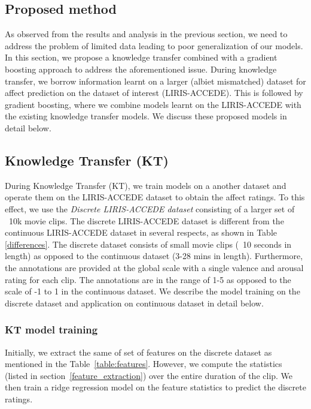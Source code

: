 \documentclass{article}
\begin{document}
\subsection{Proposed method}
As observed from the results and analysis in the previous section, we need to address the problem of limited data leading to poor generalization of our models.
In this section, we propose a knowledge transfer combined with a gradient boosting approach to address the aforementioned issue.
During knowledge transfer, we borrow information learnt on a larger (albiet mismatched) dataset for affect prediction on the dataset of interest (LIRIS-ACCEDE).
This is followed by gradient boosting, where we combine models learnt on the LIRIS-ACCEDE with the existing knowledge transfer models.
We discuss these proposed models in detail below. 

\subsection{Knowledge Transfer (KT)}
During Knowledge Transfer (KT), we train models on a another dataset and operate them on the LIRIS-ACCEDE dataset to obtain the affect ratings.
To this effect, we use the {\it Discrete LIRIS-ACCEDE dataset} consisting of a larger set of ~10k movie clips.  
The discrete LIRIS-ACCEDE dataset is different from the continuous LIRIS-ACCEDE dataset in several respects, as shown in Table \ref{differences}.
The discrete dataset consists of small movie clips (~10 seconds in length) as opposed to the continuous dataset (3-28 mins in length).
Furthermore, the annotations are provided at the global scale with a single valence and arousal rating for each clip.
The annotations are in the range of 1-5 as opposed to the scale of -1 to 1 in the continuous dataset. 
We describe the model training on the discrete dataset and application on continuous dataset in detail below.

\subsubsection{KT model training}
Initially, we extract the same of set of features on the discrete dataset as mentioned in the Table~\ref{table:features}.
However, we compute the statistics (listed in section~\ref{feature_extraction}) over the entire duration of the clip.
We then train a ridge regression model on the feature statistics to predict the discrete ratings.
\end{document}
